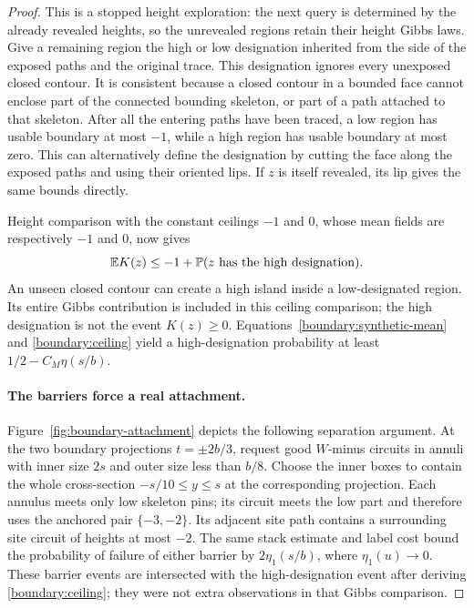 \begin{proof}
This is a stopped height exploration: the next query is determined
by the already revealed heights, so the unrevealed regions retain
their height Gibbs laws.  Give a remaining region the high or low
designation inherited from the side of the exposed paths and the
original trace.  This designation ignores every unexposed closed
contour.  It is consistent because a closed contour in a bounded
face cannot enclose part of the connected bounding skeleton, or
part of a path attached to that skeleton.  After all the entering
paths have been traced, a low region has usable boundary at most
$-1$, while a high region has usable boundary at most zero.  This
can alternatively define the designation by cutting the face along
the exposed paths and using their oriented lips.  If $z$ is itself
revealed, its lip gives the same bounds directly.

Height comparison with the constant ceilings $-1$ and $0$, whose
mean fields are respectively $-1$ and $0$, now gives
\begin{equation}
 \mathbb E K(z)\le -1+\mathbb P(z\hbox{ has the high designation}).
 \label{boundary:ceiling}
\end{equation}
An unseen closed contour can create a high island inside a
low-designated region.  Its entire Gibbs contribution is included
in this ceiling comparison; the high designation is not the event
$K(z)\ge0$.  Equations~\eqref{boundary:synthetic-mean} and
\eqref{boundary:ceiling} yield a high-designation probability at
least $1/2-C_M\eta(s/b)$.

\paragraph{The barriers force a real attachment.}
Figure~\ref{fig:boundary-attachment} depicts the following separation
argument.
At the two boundary projections $t=\pm2b/3$, request good $W$-minus
circuits in annuli with inner size $2s$ and outer size less than
$b/8$.  Choose the inner boxes to contain the whole cross-section
$-s/10\le y\le s$ at the corresponding projection.  Each annulus
meets only low skeleton pins; its circuit meets the low part and
therefore uses the anchored pair $\{-3,-2\}$.  Its adjacent site
path contains a surrounding site circuit of heights at most $-2$.
The same stack estimate and label cost bound the probability of
failure of either barrier by $2\eta_1(s/b)$, where
$\eta_1(u)\to0$.  These barrier events are intersected with the
high-designation event after deriving \eqref{boundary:ceiling}; they
were not extra observations in that Gibbs comparison.


\end{proof}
